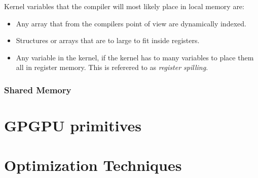 Kernel variables that the compiler will most likely place in local memory are:

\begin{itemize}
  \item Any array that from the compilers point of view are dynamically indexed.
  \item Structures or arrays that are to large to fit inside registers.
  \item Any variable in the kernel, if the kernel has to many
    variables to place them all in register memory. This is referered
    to as \textit{register spilling}.
\end{itemize}


\subsubsection{Shared Memory}












\section{GPGPU primitives}






\section{Optimization Techniques}

